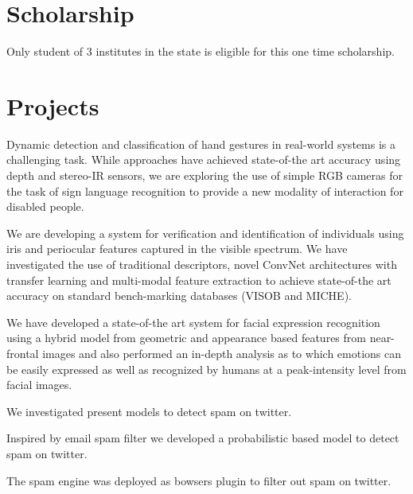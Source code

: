 \section{Scholarship}

\descript{}
\begin{tightemize}
	\item Only student of 3 institutes in the state is eligible for this one time scholarship.
\end{tightemize}
\sectionsep

\section{Projects}

Dynamic detection and classification of hand gestures in real-world systems is a challenging task. While approaches have
achieved state-of-the art accuracy using depth and stereo-IR sensors, we are exploring the use of simple RGB cameras for the task
of sign language recognition to provide a new modality of interaction for disabled people.

\sectionsep

We are developing a system for verification and identification of individuals using iris and periocular features captured in the visible spectrum. We have investigated the use of traditional descriptors, novel ConvNet architectures with transfer learning and multi-modal feature extraction to achieve state-of-the art accuracy on standard bench-marking databases (VISOB and MICHE).
\sectionsep

We have developed a state-of-the art system for facial expression recognition using a hybrid model from geometric
and appearance based features from near-frontal images and also performed an in-depth analysis as to which
emotions can be easily expressed as well as recognized by humans at a peak-intensity level from facial images.
\sectionsep

\begin{tightemize}
	\item We investigated present models to detect spam on twitter.
	\item Inspired by email spam filter we developed a probabilistic based model to detect spam on twitter.
	\item The spam engine was deployed as bowsers plugin to filter out spam on twitter.
\end{tightemize}
\sectionsep

